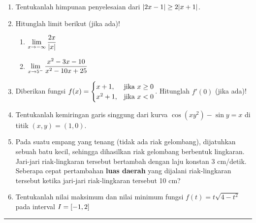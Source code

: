 \begin{enumerate}[leftmargin=*, label={\arabic*}.]
\item Tentukanlah himpunan penyelesaian dari $\abs{2x-1} \geq 2\abs{x+1}$.
\item Hitunglah limit berikut (jika ada)!
    \begin{enumerate}[label={\alph*}.]
        \item $\ds \lim_{x\to -\infty} \frac{2x}{\abs{x}}$
        \item $\ds \lim_{x\to 5^{-}} \frac{x^{2}-3x-10}{x^{2}-10x+25}$
    \end{enumerate}
\item Diberikan fungsi 
$\ds
    f(x) = 
    \begin{cases}
        x+1, &\text{jika $x \geq 0$}\\
        x^{2}+1, &\text{jika $x < 0$}
    \end{cases}
$. Hitunglah $f'(0)$ (jika ada)!
\item Tentukanlah kemiringan garis singgung dari kurva $\cos (xy^{2})-\sin y = x$ 
di titik $(x,y) = (1,0)$.
\item Pada suatu empang yang tenang (tidak ada riak gelombang), dijatuhkan sebuah 
batu kecil, sehingga dihasilkan riak gelombang berbentuk lingkaran. Jari-jari 
riak-lingkaran tersebut bertambah dengan laju konstan 3 cm/detik. Seberapa cepat 
pertambahan \textbf{luas daerah} yang dijalani riak-lingkaran tersebut ketika 
jari-jari riak-lingkaran tersebut 10 cm?
\item Tentukanlah nilai maksimum dan nilai minimum fungsi $f(t)=t\sqrt{4-t^{2}}$ 
pada interval $I = \cic*{-1,2}$
\end{enumerate}
\vspace{0.2cm}
\hrule height 1pt

